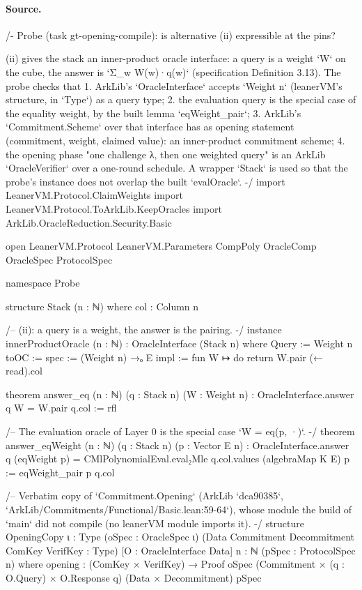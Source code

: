 \paragraph{Source.}
\begin{leancode}
/-
Probe (task gt-opening-compile): is alternative (ii) expressible at the pins?

(ii) gives the stack an inner-product oracle interface: a query is a weight `W` on the cube, the
answer is `Σ_w W(w)·q(w)` (specification Definition 3.13). The probe checks that
  1. ArkLib's `OracleInterface` accepts `Weight n` (leanerVM's structure, in `Type`) as a query type;
  2. the evaluation query is the special case of the equality weight, by the built lemma
     `eqWeight_pair`;
  3. ArkLib's `Commitment.Scheme` over that interface has as opening statement
     (commitment, weight, claimed value): an inner-product commitment scheme;
  4. the opening phase "one challenge λ, then one weighted query" is an ArkLib `OracleVerifier`
     over a one-round schedule.
A wrapper `Stack` is used so that the probe's instance does not overlap the built `evalOracle`.
-/
import LeanerVM.Protocol.ClaimWeights
import LeanerVM.Protocol.ToArkLib.KeepOracles
import ArkLib.OracleReduction.Security.Basic

open LeanerVM.Protocol LeanerVM.Parameters CompPoly OracleComp OracleSpec ProtocolSpec

namespace Probe

structure Stack (n : ℕ) where
  col : Column n

/-- (ii): a query is a weight, the answer is the pairing. -/
instance innerProductOracle (n : ℕ) : OracleInterface (Stack n) where
  Query := Weight n
  toOC :=
    { spec := (Weight n) →ₒ E
      impl := fun W ↦ do return W.pair (← read).col }

theorem answer_eq (n : ℕ) (q : Stack n) (W : Weight n) :
    OracleInterface.answer q W = W.pair q.col := rfl

/-- The evaluation oracle of Layer 0 is the special case `W = eq(p, ·)`. -/
theorem answer_eqWeight (n : ℕ) (q : Stack n) (p : Vector E n) :
    OracleInterface.answer q (eqWeight p)
      = CMlPolynomialEval.eval₂Mle q.col.values (algebraMap K E) p :=
  eqWeight_pair p q.col

/-- Verbatim copy of `Commitment.Opening` (ArkLib `dca90385`,
`ArkLib/Commitments/Functional/Basic.lean:59-64`), whose module the build of `main` did not
compile (no leanerVM module imports it). -/
structure OpeningCopy {ι : Type} (oSpec : OracleSpec ι) (Data Commitment Decommitment ComKey VerifKey : Type)
    [O : OracleInterface Data] {n : ℕ} (pSpec : ProtocolSpec n) where
  opening : (ComKey × VerifKey) →
    Proof oSpec (Commitment × (q : O.Query) × O.Response q) (Data × Decommitment) pSpec


\end{leancode}
